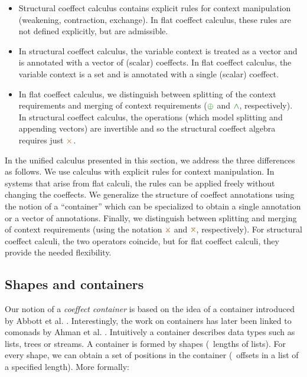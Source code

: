 \begin{itemize}
\item Structural coeffect calculus contains explicit rules for context manipulation
  (weakening, contraction, exchange). In flat coeffect calculus, these rules are not defined
  explicitly, but are admissible.

\item In structural coeffect calculus, the variable context is treated as a vector
  and is annotated with a vector of (scalar) coeffects. In flat coeffect calculus,
  the variable context is a set and is annotated with a single (scalar) coeffect.

\item In flat coeffect calculus, we distinguish between splitting of the context requirements
  and merging of context requirements ($\cpar$ and $\czip$, respectively). In structural
  coeffect calculus, the operations (which model splitting and appending vectors) are invertible 
  and so the structural coeffect algebra requires just $\atimes$.
\end{itemize}

\noindent
In the unified calculus presented in this section, we address the three differences as follows.
We use calculus with explicit rules for context manipulation. In systems that arise from flat
calculi, the rules can be applied freely without changing the coeffects. We generalize the 
structure of coeffect annotations using the notion of a ``container'' which can be specialized 
to obtain a single annotation or a vector of annotations. Finally, we distinguish between 
splitting and merging of context requirements (using the notation $\apar$ and $\azip$, 
respectively). For structural coeffect calculi, the two operators coincide, but for flat
coeffect calculi, they provide the needed flexibility.

\subsection{Shapes and containers}

Our notion of a \emph{coeffect container} is based on the idea of a container introduced by 
Abbott et al. \cite{types-containers}. Interestingly, the work on containers has later been linked
to comonads by Ahman et al. \cite{comonads-containers}. Intuitively a container describes data
types such as lists, trees or streams. A container is formed by shapes (\eg~lengths of lists).
For every shape, we can obtain a set of positions in the container (\eg~offsets in a list of a
specified length). More formally:

